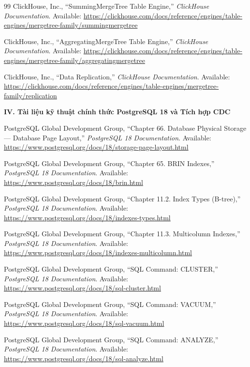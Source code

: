 \documentclass[13pt,a4paper]{report}
\begin{document}
\begin{thebibliography}{99}
 ClickHouse, Inc., ``SummingMergeTree Table Engine,'' \textit{ClickHouse Documentation}. Available: \url{https://clickhouse.com/docs/reference/engines/table-engines/mergetree-family/summingmergetree}

 ClickHouse, Inc., ``AggregatingMergeTree Table Engine,'' \textit{ClickHouse Documentation}. Available: \url{https://clickhouse.com/docs/reference/engines/table-engines/mergetree-family/aggregatingmergetree}

 ClickHouse, Inc., ``Data Replication,'' \textit{ClickHouse Documentation}. Available: \url{https://clickhouse.com/docs/reference/engines/table-engines/mergetree-family/replication}

\item[] \hspace{-\leftmargin}\textbf{IV. Tài liệu kỹ thuật chính thức PostgreSQL 18 và Tích hợp CDC}

 PostgreSQL Global Development Group, ``Chapter 66. Database Physical Storage --- Database Page Layout,'' \textit{PostgreSQL 18 Documentation}. Available: \url{https://www.postgresql.org/docs/18/storage-page-layout.html}

 PostgreSQL Global Development Group, ``Chapter 65. BRIN Indexes,'' \textit{PostgreSQL 18 Documentation}. Available: \url{https://www.postgresql.org/docs/18/brin.html}

 PostgreSQL Global Development Group, ``Chapter 11.2. Index Types (B-tree),'' \textit{PostgreSQL 18 Documentation}. Available: \url{https://www.postgresql.org/docs/18/indexes-types.html}

 PostgreSQL Global Development Group, ``Chapter 11.3. Multicolumn Indexes,'' \textit{PostgreSQL 18 Documentation}. Available: \url{https://www.postgresql.org/docs/18/indexes-multicolumn.html}

 PostgreSQL Global Development Group, ``SQL Command: CLUSTER,'' \textit{PostgreSQL 18 Documentation}. Available: \url{https://www.postgresql.org/docs/18/sql-cluster.html}

 PostgreSQL Global Development Group, ``SQL Command: VACUUM,'' \textit{PostgreSQL 18 Documentation}. Available: \url{https://www.postgresql.org/docs/18/sql-vacuum.html}

 PostgreSQL Global Development Group, ``SQL Command: ANALYZE,'' \textit{PostgreSQL 18 Documentation}. Available: \url{https://www.postgresql.org/docs/18/sql-analyze.html}


\end{thebibliography}
\end{document}
